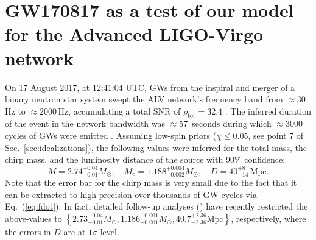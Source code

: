 \documentclass[prd,amsmath,amssymb,aps,floats,amsfonts,notitlepage,superscriptaddress,eqsecnum,nofootinbib,10pt]{revtex4-1}
\newcommand{\be}{\begin{equation}}
\newcommand{\ee}{\end{equation}}
\begin{document}
\begin{enumerate}
%
\end{enumerate}
%
%
%
\section{GW170817 as a test of our model for the Advanced LIGO-Virgo network}\label{sec:GW170817}
On 17 August 2017, at 12:41:04 UTC, GWs from the inspiral and merger of a binary neutron star system %
swept the ALV network's frequency band from $\approx 30\,$Hz to $\approx 2000\,$Hz, accumulating a total SNR of
$\rho_\text{tot} = 32.4$ \cite{GW170817}.
The inferred duration of the event in the network bandwidth was $\approx 57\,$ seconds during which $\approx 3000$ cycles of GWs were emitted \cite{GW170817_Facts}.
Assuming low-spin priors  ($\chi \le 0.05$, see point 7 of Sec.~\ref{sec:idealizations}), the following values were inferred for the total mass, the chirp mass,
and the luminosity distance of the source with 90\% confidence:
%
\be
M = 2.74^{+0.04}_{-0.01} M_\odot,\quad M_c = 1.188^{+0.004}_{-0.002} M_\odot,\quad D= 40^{+8}_{-14}\,\text{Mpc}. \label{eq:GW170817_params}
\ee
%
Note that the error bar for the chirp mass is very small
due to the fact that it can be extracted to high precision over thousands of GW cycles via Eq.~(\ref{eq:fdot}). In fact, detailed follow-up analyses (\cite{GW170817_2018}) have recently restricted the above-values to
%
$ \left\{2.73^{+0.04}_{-0.01} M_\odot, 1.186^{+0.001}_{-0.001}M_\odot , 40.7^{+2.36}_{-2.36}\text{Mpc}\right\}$, respectively,
%
where the errors in $D$ are at $1\sigma$ level.
\end{document}
